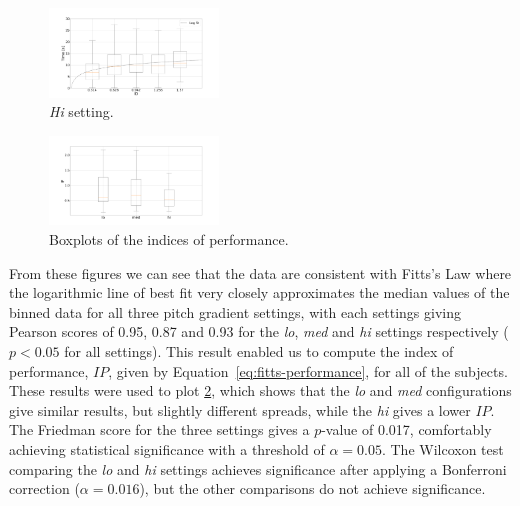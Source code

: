 \documentclass[sigconf, review=true, screen=true, anonymous=true]{acmart}
\begin{document}
\begin{figure}
  \centering
  \includegraphics[clip, trim=120 20 120 20, width=0.4\textwidth]{figures/fitts_hi.png}
  \caption{\emph{Hi} setting. }
  \label{fig:fitts-hi}
\end{figure}
\begin{figure}
  \centering
  \includegraphics[clip, trim=90 20 130 20, width=0.4\textwidth]{figures/fitts_performance.png}
  \caption{Boxplots of the indices of performance.}
  \label{fig:fitts-performance}
\end{figure}

From these figures we can see that the data are consistent with Fitts's Law where the logarithmic line of best fit very closely approximates the median values of the binned data for all three pitch gradient settings, with each settings giving Pearson scores of 0.95, 0.87 and 0.93 for the \emph{lo}, \emph{med} and \emph{hi} settings respectively ($p < 0.05$ for all settings). 
This result enabled us to compute the index of performance, $IP$, given by Equation~\ref{eq:fitts-performance}, for all of the subjects.
These results were used to plot \cref{fig:fitts-performance}, which shows that the \emph{lo} and \emph{med} configurations give similar results, but slightly different spreads, while the \emph{hi} gives a lower $IP$.
The Friedman score for the three settings gives a $p$-value of 0.017, comfortably achieving statistical significance with a threshold of $\alpha=0.05$.
The Wilcoxon test comparing the \emph{lo} and \emph{hi} settings achieves significance after applying a Bonferroni correction ($\alpha=0.016$), but the other comparisons do not achieve significance. 
\end{document}
